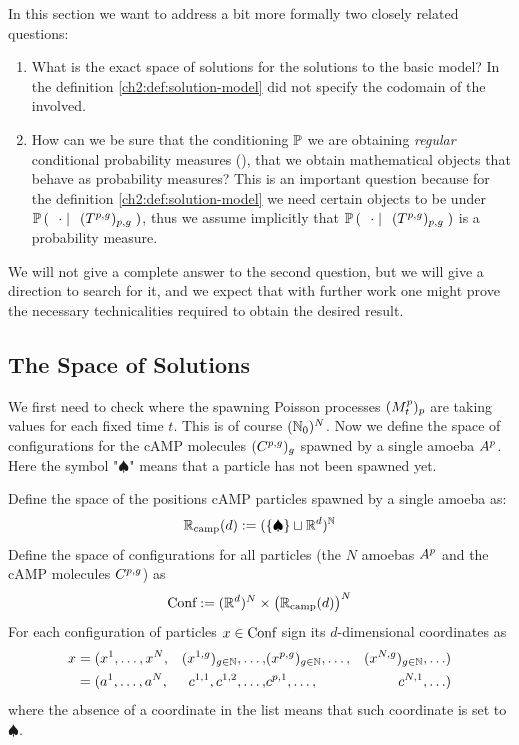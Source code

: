 In this section we want to address a bit more formally two closely related questions:
\begin{enumerate}
	\item What is the exact space of solutions for the solutions to the basic model? In the definition \ref{ch2:def:solution-model} did not specify the codomain of the \rv involved.
	\item How can we be sure that the conditioning $\mathbb{P}$ we are obtaining \emph{regular} conditional probability measures (\cite[Chapter 10.2,first definition]{dudley}), \ie that we obtain mathematical objects that behave as probability measures?
	This is an important question because for the definition \ref{ch2:def:solution-model} we need certain objects to be \Bm under $\mathbb{P} \left( \; \left. \; \cdot \; \right| \; \;(T^{p,g})_{p,g}  \; \right)$, thus we assume implicitly that $\mathbb{P} \left( \; \left. \; \cdot \; \right| \; \;(T^{p,g})_{p,g}  \; \right)$ is a probability measure.
\end{enumerate}

We will not give a complete answer to the second question, but we will give a direction to search for it, and we expect that with further work one might prove the necessary technicalities required to obtain the desired result.

\subsection{The Space of Solutions}\label{app:formal-def-solution}

We first need to check where the spawning Poisson processes $(M_t^p)_p$ are taking values for each fixed time $t$.
This is of course $(\mathbb{N}_0)^N$.
Now we define the space of configurations for the cAMP molecules $(C^{p,g})_g$ spawned by a single amoeba $A^p$.
Here the symbol "$\spadesuit$" means that a particle has not been spawned yet.

\begin{definition}
Define the space of the positions cAMP particles spawned by a single amoeba as:
\begin{equation*}
\mathbb{R}_{\text{camp}}(d):= (\{\spadesuit\} \sqcup \mathbb{R}^d)^{\mathbb{N}}
\end{equation*}
Define the space of configurations for all particles (the $N$ amoebas $A^p$ and the cAMP molecules $C^{p,g}$) as
\begin{equation*}
\text{Conf}:=(\mathbb{R}^d)^N \times\big(\mathbb{R}_{\text{camp}}(d)\big)^N
\end{equation*}
For each configuration of particles $x\in \text{Conf}$ sign its $d$-dimensional coordinates as 
\begin{equation*}
\begin{aligned}
x &= (x^1, \ldots, x^N, 
	&(x^{1,g})_{g\in\mathbb{N}}, \ldots, 
	&(x^{p,g})_{g\in\mathbb{N}}, \ldots, 
	&(x^{N,g})_{g\in\mathbb{N}},\ldots)
\\
&= (a^1, \ldots, a^N, 
	&c^{1,1}, c^{1,2}, \ldots, 
	&c^{p,1},\ldots, 
	&c^{N,1}, \ldots)
\end{aligned}
\end{equation*}
where the absence of a coordinate in the list means that such coordinate is set to $\spadesuit$.
\end{definition}

